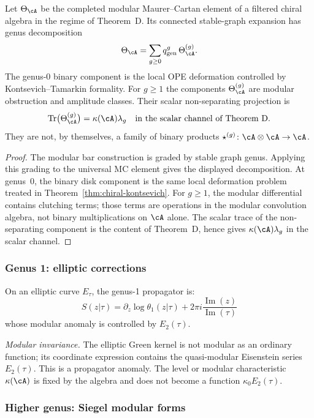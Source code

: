 \begin{theorem}\label{thm:deformation-genus-expansion}
Let $\Theta_{\cA}$ be the completed modular Maurer--Cartan element of a
filtered chiral algebra in the regime of Theorem~D. Its connected
stable-graph expansion has genus decomposition
\[
\Theta_{\cA}=\sum_{g\geq0}q_{\mathrm{gen}}^g\,\Theta_{\cA}^{(g)}.
\]
The genus-$0$ binary component is the local OPE deformation controlled
by Kontsevich--Tamarkin formality. For $g\geq1$ the components
\(\Theta_{\cA}^{(g)}\) are modular obstruction and amplitude classes.
Their scalar non-separating projection is
\[
\operatorname{Tr}\bigl(\Theta_{\cA}^{(g)}\bigr)
=\kappa(\cA)\lambda_g
\quad\text{in the scalar channel of Theorem~D.}
\]
They are not, by themselves, a family of binary products
\(\star^{(g)}\colon \cA\otimes\cA\to\cA\).
\end{theorem}

\begin{proof}
The modular bar construction is graded by stable graph genus. Applying
this grading to the universal MC element gives the displayed
decomposition. At genus~$0$, the binary disk component is the same
local deformation problem treated in
Theorem~\ref{thm:chiral-kontsevich}. For $g\geq1$, the modular
differential contains clutching terms; those terms are operations in
the modular convolution algebra, not binary multiplications on
$\cA$ alone. The scalar trace of the non-separating component is the
content of Theorem~D, hence gives $\kappa(\cA)\lambda_g$ in the scalar
channel.
\end{proof}

\subsubsection{Genus 1: elliptic corrections}

On an elliptic curve $E_\tau$, the genus-1 propagator is:
\[S(z|\tau) = \partial_z \log \theta_1(z|\tau) + 2\pi i \frac{\operatorname{Im}(z)}{\operatorname{Im}(\tau)}\]
whose modular anomaly is controlled by $E_2(\tau)$.

\emph{Modular invariance.}
The elliptic Green kernel is not modular as an ordinary function; its
coordinate expression contains the quasi-modular Eisenstein series
$E_2(\tau)$. This is a propagator anomaly. The level or modular
characteristic $\kappa(\cA)$ is fixed by the algebra and does not
become a function $\kappa_0E_2(\tau)$.

\subsubsection{Higher genus: Siegel modular forms}

